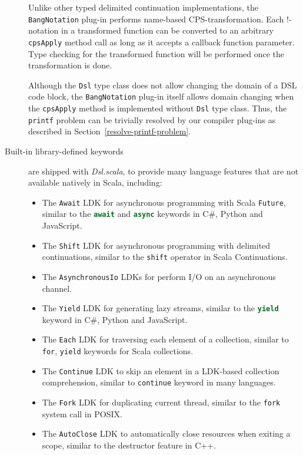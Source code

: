\begin{description}
  Unlike other typed delimited continuation implementations, the \lstinline{BangNotation} plug-in performs name-based CPS-transformation. Each !-notation in a transformed function can be converted to an arbitrary \lstinline{cpsApply} method call as long as it accepts a callback function parameter. Type checking for the transformed function will be performed once the transformation is done.

  Although the \lstinline{Dsl} type class does not allow changing the domain of a DSL code block, the \lstinline{BangNotation} plug-in itself allows domain changing when the \lstinline{cpsApply} method is implemented without \lstinline{Dsl} type class. Thus, the \lstinline{printf} problem can be trivially resolved by our compiler plug-ins as described in Section~\ref{resolve-printf-problem}.
  \item[Built-in library-defined keywords] are shipped with \textit{Dsl.scala}, to provide many language features that are not available natively in Scala, including:
  \begin{itemize}
    \item The \lstinline{Await} LDK for asynchronous programming with Scala \lstinline{Future}, similar to the \lstinline[language=Python,style=Python3]{await} and \lstinline[language=Python,style=Python3]{async} keywords in C\#, Python and JavaScript.
    \item The \lstinline{Shift} LDK for asynchronous programming with delimited continuations, similar to the \lstinline{shift} operator in Scala Continuations.
    \item The \lstinline{AsynchronousIo} LDKs for perform I/O on an asynchronous channel.
    \item The \lstinline{Yield} LDK for generating lazy streams, similar to the \lstinline[language=Python,style=Python3]{yield} keyword in C\#, Python and JavaScript.
    \item The \lstinline{Each} LDK for traversing each element of a collection, similar to \lstinline{for}, \lstinline{yield} keywords for Scala collections.
    \item The \lstinline{Continue} LDK to skip an element in a LDK-based collection comprehension, similar to \lstinline{continue} keyword in many languages.
    \item The \lstinline{Fork} LDK for duplicating current thread, similar to the \lstinline{fork} system call in POSIX.
    \item The \lstinline{AutoClose} LDK to automatically close resources when exiting a scope, similar to the destructor feature in C++.

\end{itemize}
\end{description}
